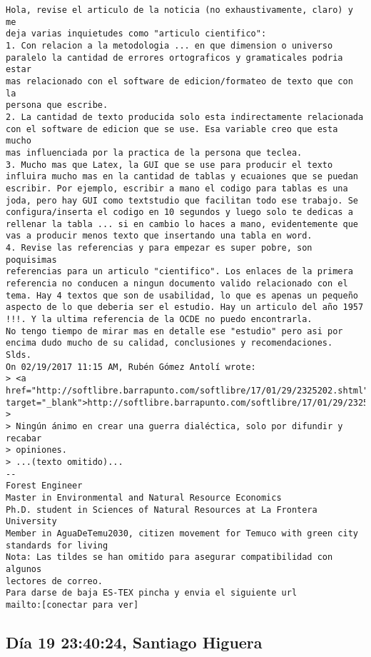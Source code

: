 \documentclass[a4paper,10pt]{article}
\begin{document}
\begin{lstlisting}
Hola, revise el articulo de la noticia (no exhaustivamente, claro) y me 
deja varias inquietudes como "articulo cientifico":
1. Con relacion a la metodologia ... en que dimension o universo 
paralelo la cantidad de errores ortograficos y gramaticales podria estar 
mas relacionado con el software de edicion/formateo de texto que con la 
persona que escribe.
2. La cantidad de texto producida solo esta indirectamente relacionada 
con el software de edicion que se use. Esa variable creo que esta mucho 
mas influenciada por la practica de la persona que teclea.
3. Mucho mas que Latex, la GUI que se use para producir el texto 
influira mucho mas en la cantidad de tablas y ecuaiones que se puedan 
escribir. Por ejemplo, escribir a mano el codigo para tablas es una 
joda, pero hay GUI como textstudio que facilitan todo ese trabajo. Se 
configura/inserta el codigo en 10 segundos y luego solo te dedicas a 
rellenar la tabla ... si en cambio lo haces a mano, evidentemente que 
vas a producir menos texto que insertando una tabla en word.
4. Revise las referencias y para empezar es super pobre, son poquisimas 
referencias para un articulo "cientifico". Los enlaces de la primera 
referencia no conducen a ningun documento valido relacionado con el 
tema. Hay 4 textos que son de usabilidad, lo que es apenas un pequeño 
aspecto de lo que deberia ser el estudio. Hay un articulo del año 1957 
!!!. Y la ultima referencia de la OCDE no puedo encontrarla.
No tengo tiempo de mirar mas en detalle ese "estudio" pero asi por 
encima dudo mucho de su calidad, conclusiones y recomendaciones.
Slds.
On 02/19/2017 11:15 AM, Rubén Gómez Antolí wrote:
> <a href="http://softlibre.barrapunto.com/softlibre/17/01/29/2325202.shtml" target="_blank">http://softlibre.barrapunto.com/softlibre/17/01/29/2325202.shtml</a>
>
> Ningún ánimo en crear una guerra dialéctica, solo por difundir y recabar
> opiniones.
> ...(texto omitido)...
-- 
Forest Engineer
Master in Environmental and Natural Resource Economics
Ph.D. student in Sciences of Natural Resources at La Frontera University
Member in AguaDeTemu2030, citizen movement for Temuco with green city 
standards for living
Nota: Las tildes se han omitido para asegurar compatibilidad con algunos 
lectores de correo.
Para darse de baja ES-TEX pincha y envia el siguiente url
mailto:[conectar para ver]

\end{lstlisting}

\subsection{Día 19 23:40:24, Santiago Higuera}
\end{document}
